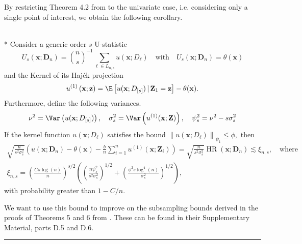 By restricting Theorem 4.2 from \citet{ritzwoller_uniform_2024} to the univariate case, i.e. considering only a single point of interest, we obtain the following corollary.
\begin{cor}\mbox{}\\*
	Consider a generic order $s$ U-statistic
	\begin{equation}
		U_{s}(\mathbf{x}; \mathbf{D}_n)
		= \binom{n}{s}^{-1} \sum_{\ell \in L_{n,s}}u(\mathbf{x}; D_{\ell})
		\quad \text{with} \quad
		U_{s}(\mathbf{x}; \mathbf{D}_n) = \theta(\mathbf{x})
	\end{equation}
	and the Kernel of its Haj\'ek projection
	\begin{equation}
		u^{(1)}\left(\mathbf{x}; \mathbf{z}\right)
		= \E\left[u(\mathbf{x}; D_{[s]}) \, | \, \mathbf{Z}_1 = \mathbf{z}\right] - \theta(\mathbf{x}).
	\end{equation}
	Furthermore, define the following variances.
	\begin{equation}
		\nu^2 = \Var\left(u(\mathbf{x}; D_{[s]})\right), \quad
		\sigma_{s}^2 = \Var\left(u^{(1)}(\mathbf{x}; \mathbf{Z})\right), \quad
		\psi_{s}^2 = \nu^2 - s \sigma_{s}^2
	\end{equation}
	If the kernel function $u\left(\mathbf{x} ; D_{\ell}\right)$ satisfies the bound
	$\left\|u(\mathbf{x}; D_{\ell})\right\|_{\psi_1} \leq \phi,$
	then
	\begin{align}
		\sqrt{\frac{n}{{s}^2 \sigma_{s}^2}}
		\left(u(\mathbf{x}; \mathbf{D}_n) - \theta(\mathbf{x}) - \frac{b}{n} \sum_{i=1}^n u^{(1)}(\mathbf{x}; \mathbf{Z}_{i})\right)
		= \sqrt{\frac{n}{{s}^2 \sigma_{s}^2}} \operatorname{HR}(\mathbf{x}; \mathbf{D}_n)
		\lesssim \xi_{n, s},
		\quad \text {where} \\
		\xi_{n, s}
		= \left(\frac{C s \log(n)}{n}\right)^{s / 2}\left(\left(\frac{n \psi_{s}^2}{{s}^2 \sigma_{s}^2}\right)^{1 / 2}+\left(\frac{\phi^2 s \log ^4(n)}{\sigma_{s}^2}\right)^{1 / 2}\right),
	\end{align}
	with probability greater than $1-C / n$.
\end{cor}

We want to use this bound to improve on the subsampling bounds derived in the proofs of Theorems 5 and 6 from \cite{demirkaya_optimal_2024}.
These can be found in their Supplementary Material, parts D.5 and D.6.

\hrule

